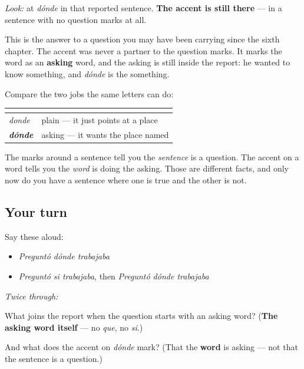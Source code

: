 \begin{culture}
\emph{Look:} at \emph{dónde} in that reported sentence. \textbf{The accent is still there} — in a sentence with no question marks at all.

This is the answer to a question you may have been carrying since the sixth chapter. The accent was never a partner to the question marks. It marks the word as an \textbf{asking} word, and the asking is still inside the report: he wanted to know something, and \emph{dónde} is the something.

Compare the two jobs the same letters can do:

\noindent
\begin{tabularx}{\linewidth}{@{}>{\raggedright\arraybackslash}X>{\raggedright\arraybackslash}X@{}}
\toprule
\textbf{} & \textbf{} \\
\midrule
\emph{donde} & plain — it just points at a place \\
\emph{\textbf{dónde}} & asking — it wants the place named \\
\bottomrule
\end{tabularx}

The marks around a sentence tell you the \emph{sentence} is a question. The accent on a word tells you the \emph{word} is doing the asking. Those are different facts, and only now do you have a sentence where one is true and the other is not.
\end{culture}

\subsection*{Your turn}
Say these aloud:

\begin{itemize}
\raggedright
  \item \emph{Preguntó dónde trabajaba}
  \item \emph{Preguntó si trabajaba}, then \emph{Preguntó dónde trabajaba}
\end{itemize}

\emph{Twice through:}

\begin{tcolorbox}[breakable,colback=teal!4,colframe=teal!35!black,title={Before you move on}]
What joins the report when the question starts with an asking word? (\textbf{The asking word itself} — no \emph{que}, no \emph{si}.)

And what does the accent on \emph{dónde} mark? (That the \textbf{word} is asking — not that the sentence is a question.)
\end{tcolorbox}
